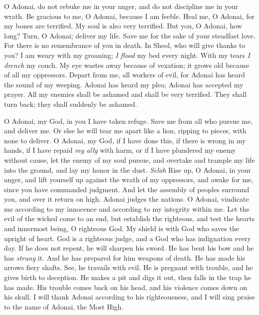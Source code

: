 \begin{biblechapter} %
 O Adonai, do not rebuke me in your anger, 
and do not discipline me in your wrath.
\verse Be gracious to me, O Adonai, because I am feeble. 
Heal me, O Adonai, for my bones are terrified.
\verse My soul is also very terrified. 
But you, O Adonai, how long?
\verse Turn, O Adonai; deliver my life. 
Save me for the sake of your steadfast love.
\verse For there is no remembrance of you in death. 
In Sheol, who will give thanks to you?
\verse I am weary with my groaning; 
\textit{I flood} my bed every night. 
With my tears \textit{I drench} my couch.
\verse My eye wastes away because of vexation; 
it grows old because of all my oppressors.
\verse Depart from me, all workers of evil, 
for Adonai has heard the sound of my weeping.
\verse Adonai has heard my plea; 
Adonai has accepted my prayer.
\verse All my enemies shall be ashamed and shall be very terrified. 
They shall turn back; they shall suddenly be ashamed.
\end{biblechapter}

\begin{biblechapter} %
 O Adonai, my God, in you I have taken refuge. 
Save me from all who pursue me, and deliver me.
\verse Or else he will tear me apart like a lion, 
ripping to pieces, with none to deliver.
\verse O Adonai, my God, if I have done this, 
if there is wrong in my hands,
\verse if I have repaid \textit{my ally} with harm, 
or if I have plundered my enemy without cause,
\verse let the enemy of my soul pursue, 
and overtake and trample my life into the ground, 
and lay my honor in the dust. \textit{Selah}
\verse Rise up, O Adonai, in your anger, 
and lift yourself up against the wrath of my oppressors, 
and awake for me, 
since you have commanded judgment.
\verse And let the assembly of peoples surround you, 
and over it return on high.
\verse Adonai judges the nations. 
O Adonai, vindicate me 
according to my innocence and according to my integrity within me.
\verse Let the evil of the wicked come to an end, 
but establish the righteous, 
and test the hearts and innermost being, O righteous God.
\verse My shield is with God 
who saves the upright of heart.
\verse God is a righteous judge, 
and a God who has indignation every day.
\verse If he does not repent, he will sharpen his sword. 
He has bent his bow and he has \textit{strung} it.
\verse And he has prepared for him weapons of death. 
He has made his arrows fiery shafts.
\verse See, he travails with evil. 
He is pregnant with trouble, 
and he gives birth to deception.
\verse He makes a pit and digs it out, 
then falls in the trap he has made.
\verse His trouble comes back on his head, 
and his violence comes down on his skull.
\verse I will thank Adonai according to his righteousness, 
and I will sing praise to the name of Adonai, the Most High.
\end{biblechapter}

